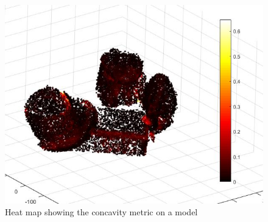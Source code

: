 \documentclass[conference]{IEEEtran}
\begin{document}
\begin{figure}
  \centering
    \includegraphics[width=\linewidth]{img/concaveHeat}
    \caption{Heat map showing the concavity metric on a model}
    \label{fig:concaveHeat}
\end{figure}


%
%



%
\end{document}
